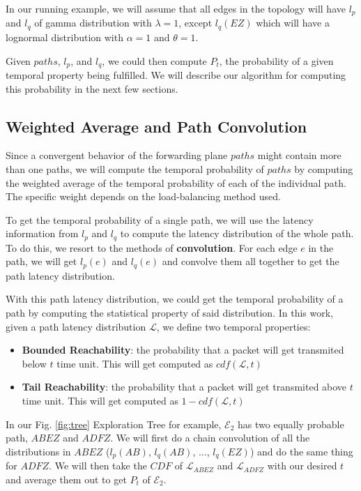 In our running example, we will assume that all edges in the topology will have $l_p$
and $l_q$ of gamma distribution with $\lambda = 1$, except $l_q(EZ)$ which will 
have a lognormal distribution with $\alpha = 1$ and $\theta = 1$.

Given $paths$, $l_p$, and $l_q$, we could then compute $P_t$, the probability of a 
given temporal property being fulfilled.
We will describe our algorithm for computing this probability in the next few 
sections.

\subsection{Weighted Average and Path Convolution}
Since a convergent behavior of the forwarding plane $paths$ might contain more than 
one paths, we will compute the temporal probability of $paths$ by computing the 
weighted average of the temporal probability of each of the individual path.
The specific weight depends on the load-balancing method used.

To get the temporal probability of a single path, we will use the latency information 
from $l_p$ and $l_q$ to compute the latency distribution of the whole path.
To do this, we resort to the methods of \textbf{convolution}.
For each edge $e$ in the path, we will get $l_p(e)$ and $l_q(e)$ and convolve them 
all together to get the path latency distribution.

With this path latency distribution, we could get the temporal probability of a 
path by computing the statistical property of said distribution.
In this work, given a path latency distribution $\mathcal{L}$, we define two temporal 
properties:
\begin{itemize}
    \item \textbf{Bounded Reachability}: the probability that a packet will get 
        transmited below $t$ time unit. This will get computed as $cdf(\mathcal{L}, t)$
    \item \textbf{Tail Reachability}: the probability that a packet will get 
        transmited above $t$ time unit. This will get computed as 
        $1 - cdf(\mathcal{L}, t)$
\end{itemize}

In our Fig. \ref{fig:tree} Exploration Tree for example, $\mathcal{E}_2$ has two 
equally probable path, $ABEZ$ and $ADFZ$.
We will first do a chain convolution of all the distributions in $ABEZ$ ($l_p(AB)$, 
$l_q(AB)$, ..., $l_q(EZ)$) and do the same thing for $ADFZ$.
We will then take the $CDF$ of $\mathcal{L}_{ABEZ}$ and $\mathcal{L}_{ADFZ}$ with our 
desired $t$ and average them out to get $P_t$ of $\mathcal{E}_2$. 

